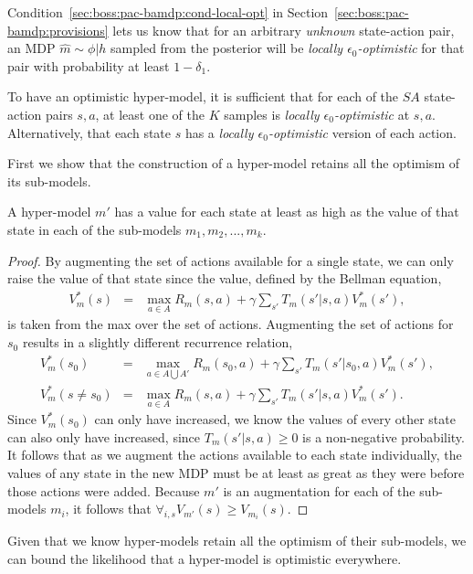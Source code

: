 Condition~\ref{sec:boss:pac-bamdp:cond-local-opt} in Section~\ref{sec:boss:pac-bamdp:provisions} lets us know that for an arbitrary \emph{unknown} state-action pair, an MDP $\hat m\sim \phi|h$ sampled from the posterior will be \emph{locally $\epsilon_0$-optimistic} for that pair with probability at least $1-\delta_1$.

To have an optimistic hyper-model, it is sufficient that for each of the $S A$ state-action pairs $s,a$, at least one of the $K$ samples is \emph{locally $\epsilon_0$-optimistic} at $s,a$. Alternatively, that each state $s$ has a \emph{locally $\epsilon_0$-optimistic} version of each action.

First we show that the construction of a hyper-model retains all the optimism of its sub-models.

\begin{lemma}
\label{sec:boss:sub-model-optimism}
A hyper-model $m'$ has a value for each state at least as high as the value of that state in each of the sub-models $m_1, m_2, ..., m_k$.
\end{lemma}
\begin{proof}
By augmenting the set of actions available for a single state, we can only raise the value of that state since the value, defined by the Bellman equation,
\begin{eqnarray}
V^*_m(s) &=& \max_{a \in A} R_m(s,a)+\gamma \sum_{s'} T_m(s'|s,a)V^*_m(s'),
\end{eqnarray}
is taken from the max over the set of actions. Augmenting the set of actions for $s_0$ results in a slightly different recurrence relation,
\begin{eqnarray}
V^*_m(s_0) &=& \max_{a \in A \bigcup A'} R_m(s_0,a)+\gamma \sum_{s'} T_m(s'|s_0,a)V^*_m(s'),\\
V^*_m(s\neq s_0) &=& \max_{a \in A} R_m(s,a)+\gamma \sum_{s'} T_m(s'|s,a)V^*_m(s').
\end{eqnarray}
Since $V^*_m(s_0)$ can only have increased, we  know the values of every other state can also only have increased, since $T_m(s'|s,a) \geq 0$ is a non-negative probability. It follows that as we augment the actions available to each state individually, the values of any state in the new MDP must be at least as great as they were before those actions were added. Because $m'$ is an augmentation for each of the sub-models $m_i$, it follows that $\forall_{i,s} V_{m'}(s) \geq V_{m_i}(s)$.
\end{proof}

Given that we know hyper-models retain all the optimism of their sub-models, we can bound the likelihood that a hyper-model is optimistic everywhere.

